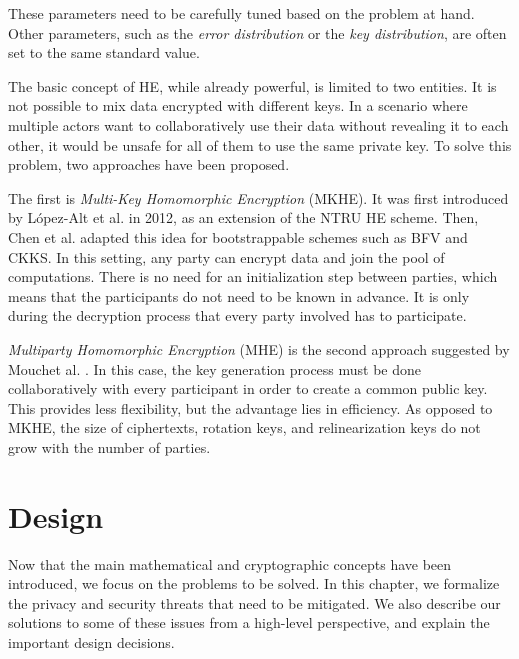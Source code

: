 \documentclass[a4paper,11pt,oneside]{report}
\begin{document}
These parameters need to be carefully tuned based on the problem at hand. 
Other parameters, such as the \emph{error distribution} or the \emph{key distribution}, are often set to the same standard value.

The basic concept of HE, while already powerful, is limited to two entities.
It is not possible to mix data encrypted with different keys.
In a scenario where multiple actors want to collaboratively use their data without revealing it to each other, it would be unsafe for all of them to use the same private key.
To solve this problem, two approaches have been proposed.

The first is \emph{Multi-Key Homomorphic Encryption} (MKHE).
It was first introduced by López-Alt et al. \cite{lopez-alt_--fly_2012} in 2012, as an extension of the NTRU HE scheme. 
Then, Chen et al. \cite{chen_efficient_2019} adapted this idea for bootstrappable schemes such as BFV and CKKS.
In this setting, any party can encrypt data and join the pool of computations.
There is no need for an initialization step between parties, which means that the participants do not need to be known in advance.
It is only during the decryption process that every party involved has to participate.

\emph{Multiparty Homomorphic Encryption} (MHE) is the second approach suggested by Mouchet al. \cite{mouchet_multiparty_2021}.
In this case, the key generation process must be done collaboratively with every participant in order to create a common public key.
This provides less flexibility, but the advantage lies in efficiency.
As opposed to MKHE, the size of ciphertexts, rotation keys, and relinearization keys do not grow with the number of parties.


\chapter{Design}\label{chap:design}



Now that the main mathematical and cryptographic concepts have been introduced, we focus on the problems to be solved.
In this chapter, we formalize the privacy and security threats that need to be mitigated.
We also describe our solutions to some of these issues from a high-level perspective, and explain the important design decisions.
\end{document}

